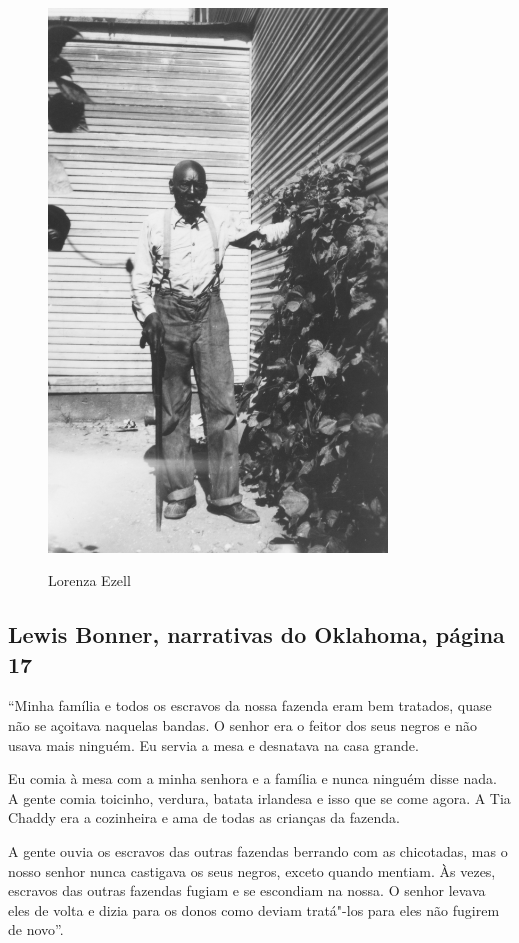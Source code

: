 \begin{figure}[]
\centering
 \includegraphics[width=90mm]{./imgs/lorenzaezzell_recorte.jpg} \label{img7}
\caption{Lorenza Ezell}
\end{figure}

\subsection{Lewis Bonner, narrativas do Oklahoma, página 17} \label{ref28}

``Minha família e todos os escravos da nossa fazenda eram bem tratados,
quase não se açoitava naquelas bandas. O senhor era o feitor dos seus
negros e não usava mais ninguém. Eu servia a mesa e desnatava na casa
grande.

Eu comia à mesa com a minha senhora e a família e nunca ninguém disse
nada. A gente comia toicinho, verdura, batata irlandesa e isso que se
come agora. A Tia Chaddy era a cozinheira e ama de todas as crianças da
fazenda.

A gente ouvia os escravos das outras fazendas berrando com as
chicotadas, mas o nosso senhor nunca castigava os seus negros, exceto
quando mentiam. Às vezes, escravos das outras fazendas fugiam e se
escondiam na nossa. O senhor levava eles de volta e dizia para os donos
como deviam tratá"-los para eles não fugirem de novo''.

